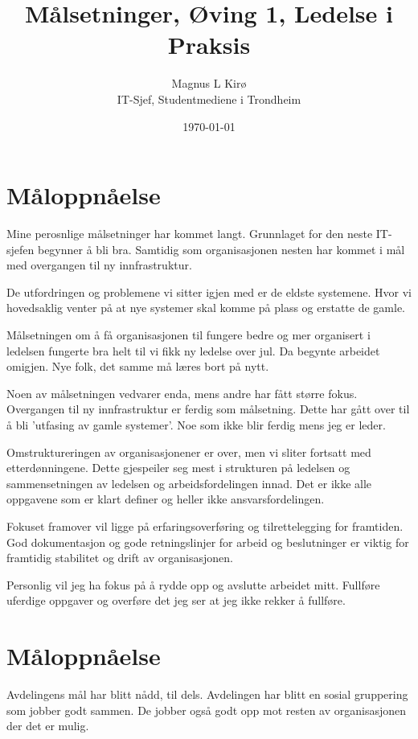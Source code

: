 \documentclass[12pt, a4paper]{article}
\title{
	Målsetninger, Øving 1, Ledelse i Praksis
}
\author{
	Magnus L Kirø \\
	IT-Sjef, Studentmediene i Trondheim 
}
\date{\today}
\begin{document}
\maketitle
{}

\section{Måloppnåelse}
Mine perosnlige målsetninger har kommet langt. Grunnlaget for den neste
IT-sjefen begynner å bli bra. Samtidig som organisasjonen nesten har kommet i
mål med overgangen til ny innfrastruktur.

De utfordringen og problemene vi sitter igjen med er de eldste systemene. Hvor
vi hovedsaklig venter på at nye systemer skal komme på plass og erstatte de
gamle.  

Målsetningen om å få organisasjonen til fungere bedre og mer organisert i
ledelsen fungerte bra helt til vi fikk ny ledelse over jul. Da begynte arbeidet
omigjen. Nye folk, det samme må læres bort på nytt. 

Noen av målsetningen vedvarer enda, mens andre har fått større fokus.
Overgangen til ny innfrastruktur er ferdig som målsetning. Dette har gått over
til å bli 'utfasing av gamle systemer'. Noe som ikke blir ferdig mens jeg er
leder. 

Omstruktureringen av organisasjonener er over, men vi sliter fortsatt med
etterdønningene. Dette gjespeiler seg mest i strukturen på ledelsen og
sammensetningen av ledelsen og arbeidsfordelingen innad. Det er ikke alle
oppgavene som er klart definer og heller ikke ansvarsfordelingen. 

Fokuset framover vil ligge på erfaringsoverføring og tilrettelegging for
framtiden. God dokumentasjon og gode retningslinjer for arbeid og beslutninger
er viktig for framtidig stabilitet og drift av organisasjonen. 

Personlig vil jeg ha fokus på å rydde opp og avslutte arbeidet mitt.
Fullføre uferdige oppgaver og overføre det jeg ser at jeg ikke rekker å
fullføre.

\section{Måloppnåelse}
Avdelingens mål har blitt nådd, til dels. Avdelingen har blitt en sosial
gruppering som jobber godt sammen. De jobber også godt opp mot resten av
organisasjonen der det er mulig. 
\end{document}
